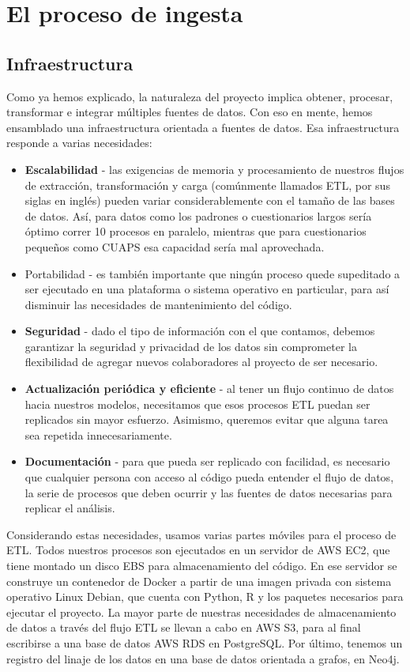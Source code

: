 \chapter{El proceso de ingesta}
\label{chap:ingesta}
\section*{Infraestructura}
Como ya hemos explicado, la naturaleza del proyecto implica obtener, procesar, transformar e integrar múltiples fuentes de datos. Con eso en mente, hemos ensamblado una infraestructura orientada a fuentes de datos. Esa infraestructura responde a varias necesidades:
\begin{itemize}
    \item \textbf{Escalabilidad} - las exigencias de memoria y procesamiento de nuestros flujos de extracción, transformación y carga (comúnmente llamados ETL, por sus siglas en inglés) pueden variar considerablemente con el tamaño de las bases de datos. Así, para datos como los padrones o cuestionarios largos sería óptimo correr 10 procesos en paralelo, mientras que para cuestionarios pequeños como CUAPS esa capacidad sería mal aprovechada.
    \item Portabilidad - es también importante que ningún proceso quede supeditado a ser ejecutado en una plataforma o sistema operativo en particular, para así disminuir las necesidades de mantenimiento del código.
    \item \textbf{Seguridad} - dado el tipo de información con el que contamos, debemos garantizar la seguridad y privacidad de los datos sin comprometer la flexibilidad de agregar nuevos colaboradores al proyecto de ser necesario.
    \item \textbf{Actualización periódica y eficiente} - al tener un flujo continuo de datos hacia nuestros modelos, necesitamos que esos procesos ETL puedan ser replicados sin mayor esfuerzo. Asimismo, queremos evitar que alguna tarea sea repetida innecesariamente.
    \item \textbf{Documentación} - para que pueda ser replicado con facilidad, es necesario que cualquier persona con acceso al código pueda entender el flujo de datos, la serie de procesos que deben ocurrir y las fuentes de datos necesarias para replicar el análisis.
\end{itemize}
Considerando estas necesidades, usamos varias partes móviles para el proceso de ETL. Todos nuestros procesos son ejecutados en un servidor de AWS EC2, que tiene montado un disco EBS para almacenamiento del código. En ese servidor se construye un contenedor de Docker a partir de una imagen privada con sistema operativo Linux Debian, que cuenta con Python, R y los paquetes necesarios para ejecutar el proyecto. La mayor parte de nuestras necesidades de almacenamiento de datos a través del flujo ETL se llevan a cabo en AWS S3, para al final escribirse a una base de datos AWS RDS en PostgreSQL. Por último, tenemos un registro del linaje de los datos en una base de datos orientada a grafos, en Neo4j.
